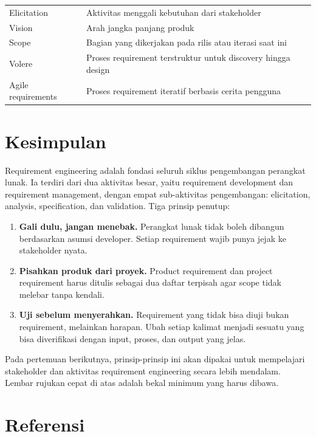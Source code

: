 \documentclass[11pt,a4paper]{article}
\begin{document}
\begin{table}[H]
\begin{tabularx}{\textwidth}{l X}
		Elicitation                & Aktivitas menggali kebutuhan dari stakeholder                                 \\
		Vision                     & Arah jangka panjang produk                                                    \\
		Scope                      & Bagian yang dikerjakan pada rilis atau iterasi saat ini                       \\
		Volere                     & Proses requirement terstruktur untuk discovery hingga design                  \\
		Agile requirements         & Proses requirement iteratif berbasis cerita pengguna                          \\
		\bottomrule
	\end{tabularx}
\end{table}

\section{Kesimpulan}

Requirement engineering adalah fondasi seluruh siklus pengembangan perangkat lunak. Ia terdiri dari dua aktivitas besar, yaitu requirement development dan requirement management, dengan empat sub-aktivitas pengembangan: elicitation, analysis, specification, dan validation. Tiga prinsip penutup:

\begin{enumerate}
	\item \textbf{Gali dulu, jangan menebak.} Perangkat lunak tidak boleh dibangun berdasarkan asumsi developer. Setiap requirement wajib punya jejak ke stakeholder nyata.
	\item \textbf{Pisahkan produk dari proyek.} Product requirement dan project requirement harus ditulis sebagai dua daftar terpisah agar scope tidak melebar tanpa kendali.
	\item \textbf{Uji sebelum menyerahkan.} Requirement yang tidak bisa diuji bukan requirement, melainkan harapan. Ubah setiap kalimat menjadi sesuatu yang bisa diverifikasi dengan input, proses, dan output yang jelas.
\end{enumerate}

Pada pertemuan berikutnya, prinsip-prinsip ini akan dipakai untuk mempelajari stakeholder dan aktivitas requirement engineering secara lebih mendalam. Lembar rujukan cepat di atas adalah bekal minimum yang harus dibawa.

\newpage
\section*{Referensi}
\end{document}

